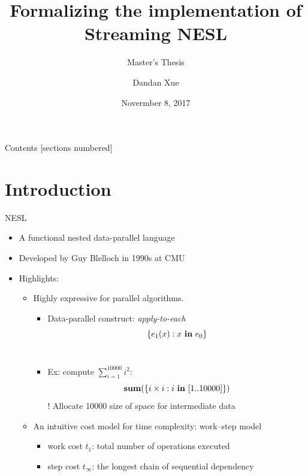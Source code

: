 \documentclass{beamer}
\title{Formalizing the implementation of \\ Streaming NESL}
\subtitle{Master's Thesis}
\author{Dandan Xue}
\date{Novermber 8, 2017}
\institute{Department of Computer Science (DIKU) \\ University of Copenhagen}
\begin{document}
\maketitle

\begin{frame}{Contents}
[sections numbered]
\tableofcontents[hideallsubsections]
\end{frame}


\section{Introduction}

\begin{frame}{NESL}

	\begin{itemize}
		\item A functional nested data-parallel language
		\item Developed by Guy Blelloch in 1990s at CMU
		\item Highlights: 
		\begin{itemize}
			\item Highly expressive for parallel algorithms. \\ 
			\begin{itemize}
			
			\item Data-parallel construct: \emph{apply-to-each} $$\{e_1(x) : x \ \mathbf{in} \ e_0 \} $$\\ 
	  \item Ex: compute $\sum_{i=1}^{10000}i^2$:
	  $$\*{sum}(\{i \times i: i \ \*{in}  \ [1..10000]\})$$
	  ! Allocate {\color{blue} 10000} size of space for intermediate data
  		\end{itemize}
	  \item An intuitive cost model for time complexity: work--step model
	  \begin{itemize}
	  	\item work cost $t_1$: total number of operations executed
	  	\item step cost $t_\infty$: the longest chain of sequential dependency
	  \end{itemize}
	\end{itemize}
	\end{itemize}
  
\end{frame}
\end{document}
